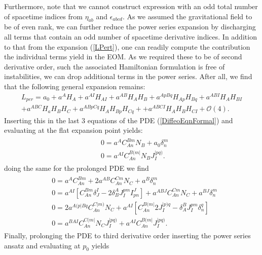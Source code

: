\documentclass[a4paper,12pt, DIV=14, BCOR=5mm, twoside, headsepline, numbers=noenddot]{scrbook}
\begin{document}
Furthermore, note that we cannot construct expression with an odd total number of spacetime indices from $\eta_{ab}$ and $\epsilon_{abcd}$. As we assumed the gravitational field to be of even rank, we can further reduce the power series expansion by discharging all terms that contain an odd number of spacetime derivative indices. In addition to that from the expansion (\ref{LPert}), one can readily compute the contribution the individual terms yield in the EOM.  As we required these to be of second derivative order, such the associated Hamiltonian formulation is free of instabilities, we can drop additional terms in the power series. After all, we find that the following general expansion remains: 
\begin{multline}\label{LperRed}
     L_{per} = a_0 + a^A H_A + a^{AI}H_{AI} + a^{AB} H_{A}H_{B} + a^{ApBq} H_{Ap}H_{Bq} + a^{ABI} H_{A} H_{BI} \\
    + a^{ABC} H_a H_B H_C + a^{ABpCq} H_{A}H_{Bp}H_{Cq} +
    + a^{ABCI} H_A H_B H_{CI} 
    + \mathcal{O}(4).
\end{multline}
Inserting this in the last 3 equations of the PDE (\ref{DiffeoEqnFormal}) and evaluating at the flat expansion point yields:
\begin{align}\label{order1}
    \begin{aligned}
    &0 = a^A C_{An}^{Bm}N_B + a_0 \delta^m_n\\
    &0 = a^{AI}C_{An}^{B(m\vert }N_B J^{\vert pq)}_I.
    \end{aligned}
\end{align}
doing the same for the prolonged PDE we find 
\begin{align}\label{order2}
    \begin{aligned}
    &0 = a^A C_{An}^{Bm} + 2 a^{AB}C_{An}^{Cm}N_C + a^B\delta^m_n\\
    &0 = a^{AI}\left [C_{An}^{Bm}\delta^I _J- 2 \delta^A_B J_I^{pm}I^J_{pn} \right ] + a^{ABJ}C_{An}^{Cm}N_C + a^{BJ} \delta^m_n \\
    &0 = 2a^{A(p\vert Bq}C_{An}^{C\vert m)}N_C + a^{AI} \left [C_{An}^{B(m\vert} 2 J_{I}^{\vert p)q} - \delta_A^BJ_I^{pm}\delta^q_n \right ]\\
    &0 = a^{BAI}C_{An}^{C(m\vert}N_CJ_I^{\vert pq)} + a^{AI}C_{An}^{B(m \vert} J_I^{\vert pq)}.
    \end{aligned}
\end{align}
Finally, prolonging the PDE to third derivative order inserting the power series ansatz and evaluating at $p_0$ yields
\end{document}
